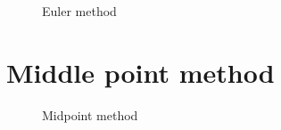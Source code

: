 \begin{figure}
  \begin{center}
  \end{center}
  \caption[]{Euler method}
  \label{fig:euler-time}
\end{figure}

\section{Middle point method}

\begin{figure}
  \begin{center}
  \end{center}
  \caption[]{Midpoint method}
  \label{fig:midpoint-method}
\end{figure}

